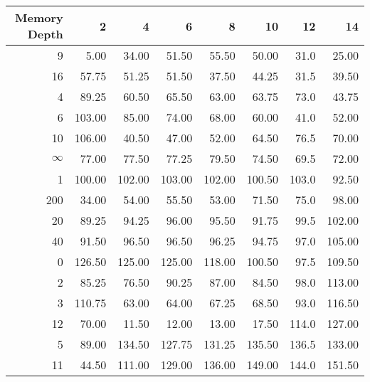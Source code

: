 \begin{tabular}{rrrrrrrr}
\toprule
 Memory Depth &       2 &       4 &       6 &       8 &      10 &     12 &      14 \\
\midrule
            9 &    5.00 &   34.00 &   51.50 &   55.50 &   50.00 &   31.0 &   25.00 \\
           16 &   57.75 &   51.25 &   51.50 &   37.50 &   44.25 &   31.5 &   39.50 \\
            4 &   89.25 &   60.50 &   65.50 &   63.00 &   63.75 &   73.0 &   43.75 \\
            6 &  103.00 &   85.00 &   74.00 &   68.00 &   60.00 &   41.0 &   52.00 \\
           10 &  106.00 &   40.50 &   47.00 &   52.00 &   64.50 &   76.5 &   70.00 \\
           $\infty$ &   77.00 &   77.50 &   77.25 &   79.50 &   74.50 &   69.5 &   72.00 \\
            1 &  100.00 &  102.00 &  103.00 &  102.00 &  100.50 &  103.0 &   92.50 \\
          200 &   34.00 &   54.00 &   55.50 &   53.00 &   71.50 &   75.0 &   98.00 \\
           20 &   89.25 &   94.25 &   96.00 &   95.50 &   91.75 &   99.5 &  102.00 \\
           40 &   91.50 &   96.50 &   96.50 &   96.25 &   94.75 &   97.0 &  105.00 \\
            0 &  126.50 &  125.00 &  125.00 &  118.00 &  100.50 &   97.5 &  109.50 \\
            2 &   85.25 &   76.50 &   90.25 &   87.00 &   84.50 &   98.0 &  113.00 \\
            3 &  110.75 &   63.00 &   64.00 &   67.25 &   68.50 &   93.0 &  116.50 \\
           12 &   70.00 &   11.50 &   12.00 &   13.00 &   17.50 &  114.0 &  127.00 \\
            5 &   89.00 &  134.50 &  127.75 &  131.25 &  135.50 &  136.5 &  133.00 \\
           11 &   44.50 &  111.00 &  129.00 &  136.00 &  149.00 &  144.0 &  151.50 \\
\bottomrule
\end{tabular}
